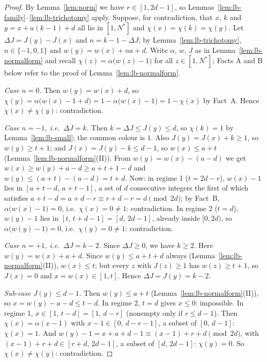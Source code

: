 \begin{proof}
By Lemma~\ref{lem:norm} we have $r \in [1, 2d-1]$, so
Lemmas~\ref{lem:lb-family}--\ref{lem:lb-trichotomy} apply. Suppose, for
contradiction, that $x$, $k$ and $y = x + a(k-1) + d$ all lie in $[1, N^{*}]$ and
$\chi(x) = \chi(k) = \chi(y)$. Let $\Delta J = J(y) - J(x)$ and
$n = k - 1 - \Delta J$; by Lemma~\ref{lem:lb-trichotomy}, $n \in \{-1, 0, 1\}$ and
$w(y) = w(x) + na + d$. Write $\alpha$, $w$, $J$ as in
Lemma~\ref{lem:lb-normalform} and recall $\chi(z) = \alpha\bigl(w(z) - 1\bigr)$
for all $z \in [1, N^{*}]$; Facts A and B below refer to the proof of
Lemma~\ref{lem:lb-normalform}.

\emph{Case $n = 0$.} Then $w(y) = w(x) + d$, so
$\chi(y) = \alpha\bigl(w(x) - 1 + d\bigr) = 1 - \alpha\bigl(w(x) - 1\bigr)
= 1 - \chi(x)$ by Fact~A. Hence $\chi(x) \ne \chi(y)$: contradiction.

\emph{Case $n = -1$, i.e.\ $\Delta J = k$.} Then $k = \Delta J \le J(y) \le d$, so
$\chi(k) = 1$ by Lemma~\ref{lem:lb-small}; the common colour is $1$. Also
$J(y) = J(x) + k \ge 1$, so $w(y) \ge t + 1$; and $J(x) = J(y) - k \le d - 1$, so
$w(x) \le a + t$ (Lemma~\ref{lem:lb-normalform}(II)). From
$w(y) = w(x) - (a - d)$ we get $w(x) \ge w(y) + a - d \ge a + t + 1 - d$ and
$w(y) \le (a + t) - (a - d) = t + d$. Now:
in regime 1 ($t = 2d - r$), $w(x) - 1$ lies in $[a + t - d,\, a + t - 1]$, a set
of $d$ consecutive integers the first of which satisfies
$a + t - d = a + d - r \equiv r + d - r = d \pmod{2d}$; by Fact~B,
$\alpha\bigl(w(x) - 1\bigr) = 0$, i.e.\ $\chi(x) = 0 \ne 1$: contradiction.
In regime 2 ($t = d$), $w(y) - 1$ lies in $[t,\, t + d - 1] = [d,\, 2d - 1]$,
already inside $[0, 2d)$, so $\alpha\bigl(w(y) - 1\bigr) = 0$, i.e.\
$\chi(y) = 0 \ne 1$: contradiction.

\emph{Case $n = +1$, i.e.\ $\Delta J = k - 2$.} Since $\Delta J \ge 0$, we have
$k \ge 2$. Here $w(y) = w(x) + a + d$. Since $w(y) \le a + t + d$ always
(Lemma~\ref{lem:lb-normalform}(II)), $w(x) \le t$; but every $z$ with
$J(z) \ge 1$ has $w(z) \ge t + 1$, so $J(x) = 0$ and $x = w(x) \in [1, t]$. Hence
$\Delta J = J(y) = k - 2$.

\emph{Sub-case $J(y) \le d - 1$.} Then $w(y) \le a + t$
(Lemma~\ref{lem:lb-normalform}(II)), so $x = w(y) - a - d \le t - d$. In regime 2,
$t = d$ gives $x \le 0$: impossible. In regime 1,
$x \in [1,\, t - d] = [1,\, d - r]$ (nonempty only if $r \le d - 1$). Then
$\chi(x) = \alpha(x - 1)$ with $x - 1 \in [0,\, d - r - 1]$, a subset of
$[0,\, d - 1]$: $\chi(x) = 1$. And
$w(y) - 1 = x + a + d - 1 \equiv (x - 1) + r + d \pmod{2d}$, with
$(x - 1) + r + d \in [r + d,\, 2d - 1]$, a subset of $[d,\, 2d - 1]$:
$\chi(y) = 0$. So $\chi(x) \ne \chi(y)$: contradiction.


\end{proof}
